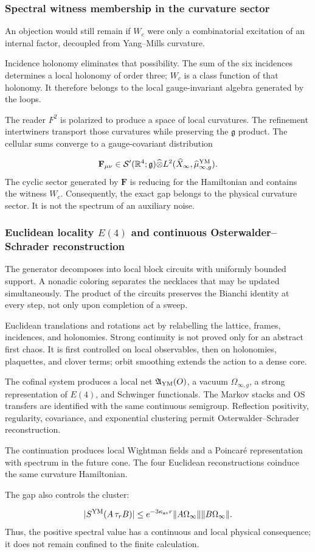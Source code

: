 \subsubsection{Spectral witness membership in the curvature sector}
An objection would still remain if \(W_c\) were only a combinatorial excitation of an internal factor, decoupled from Yang–Mills curvature.\par
Incidence holonomy eliminates that possibility. The sum of the six incidences determines a local holonomy of order three; \(W_c\) is a class function of that holonomy. It therefore belongs to the local gauge-invariant algebra generated by the loops.\par
The reader \(F^2\) is polarized to produce a space of local curvatures. The refinement intertwiners transport those curvatures while preserving the \(\mathfrak g\) product. The cellular sums converge to a gauge-covariant distribution\par
\[
\mathbf F_{\mu\nu}
\in
\mathcal S'(\mathbb R^4;\mathfrak g)
\widehat\otimes
L^2(\widehat X_\infty,\widehat\mu_{\infty,g}^{\rm YM}).
\]
The cyclic sector generated by \(\mathbf F\) is reducing for the Hamiltonian and contains the witness \(W_c\). Consequently, the exact gap belongs to the physical curvature sector. It is not the spectrum of an auxiliary noise.\par
{}
\subsubsection{Euclidean locality \(E(4)\) and continuous Osterwalder–Schrader reconstruction}
The generator decomposes into local block circuits with uniformly bounded support. A nonadic coloring separates the necklaces that may be updated simultaneously. The product of the circuits preserves the Bianchi identity at every step, not only upon completion of a sweep.\par
Euclidean translations and rotations act by relabelling the lattice, frames, incidences, and holonomies. Strong continuity is not proved only for an abstract first chaos. It is first controlled on local observables, then on holonomies, plaquettes, and clover terms; orbit smoothing extends the action to a dense core.\par
The cofinal system produces a local net \(\mathfrak A_{\rm YM}(O)\), a vacuum \(\Omega_{\infty,g}\), a strong representation of \(E(4)\), and Schwinger functionals. The Markov stacks and OS transfers are identified with the same continuous semigroup. Reflection positivity, regularity, covariance, and exponential clustering permit Osterwalder--Schrader reconstruction.\par
The continuation produces local Wightman fields and a Poincaré representation with spectrum in the future cone. The four Euclidean reconstructions coinduce the same curvature Hamiltonian.\par
The gap also controls the cluster:\par
\[
|S^{\rm YM}(A\,\tau_rB)|
\le
e^{-3\kappa_{\rm av}r}
\|A\Omega_\infty\|
\|B\Omega_\infty\|.
\]
Thus, the positive spectral value has a continuous and local physical consequence; it does not remain confined to the finite calculation.\par
{}
